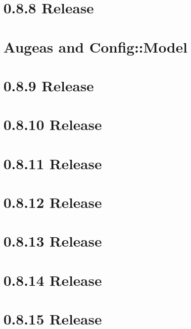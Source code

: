 \documentclass[twoside]{book}
\newcommand{\+}{\discretionary{\mbox{\scriptsize$\hookleftarrow$}}{}{}}
\begin{document}
\chapter{0.8.8 Release}
\label{doc_news_2014-09-02_0_8_8_md}

\chapter{Augeas and Config\+:\+:Model}
\label{doc_news_2014-10-22_augeas_md}

\chapter{0.8.9 Release}
\label{doc_news_2014-11-04_0_8_9_md}

\chapter{0.8.10 Release}
\label{doc_news_2014-12-02_0_8_10_md}

\chapter{0.8.11 Release}
\label{doc_news_2015-04-03_0_8_11_md}

\chapter{0.8.12 Release}
\label{doc_news_2015-07-13_0_8_12_md}

\chapter{0.8.13 Release}
\label{doc_news_2015-09-17_0_8_13_md}

\chapter{0.8.14 Release}
\label{doc_news_2015-11-19_0_8_14_md}

\chapter{0.8.15 Release}
\label{doc_news_2016-02-16_0_8_15_md}

\end{document}
